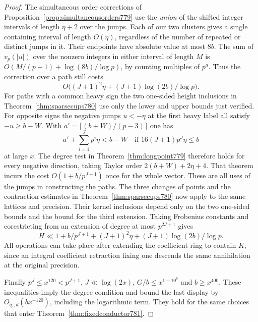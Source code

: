 \documentclass[a4paper,11pt]{article}
\theoremstyle{definition}
\theoremstyle{remark}
\numberwithin{equation}{section}
\begin{document}
\begin{proof}
The simultaneous order corrections of
Proposition~\ref{prop:simultaneousorders779} use the
\emph{union} of the shifted integer intervals of
length \(\eta+2\) over the jumps. Each of our two
clusters gives a single containing interval of length
\(O(\eta)\), regardless of the number of repeated or
distinct jumps in it. Their endpoints have absolute
value at most \(8b\). The sum of \(v_p(|u|)\) over
the nonzero integers in either interval of length
\(M\) is \(O(M/(p-1)+\log(8b)/\log p)\), by counting
multiples of \(p^a\). Thus the correction over a
path still costs
\[
        O\big((J+1)^2\eta+(J+1)\log(2b)/\log p\big).
\]
For paths with a common heavy sign the two one-sided
height inclusions in Theorem~\ref{thm:sparsecups780}
use only the lower and upper bounds just verified.
For opposite signs the negative jumps \(u<-\eta\)
at the first heavy label all satisfy \(-u\ge b-W\).
With \(a'=\lceil(b+W)/(p-3)\rceil\) one has
\[
       a'+\sum_{i=1}^Jp^i\eta<b-W
              \quad\text{if }16(J+1)p^J\eta\le b
\]
at large \(x\). The degree test in
Theorem~\ref{thm:longpoint779} therefore holds for
every negative direction, taking Taylor order
\(2(b+W)+2\eta+4\). That theorem incurs the cost
\(O(1+b/p^{J+1})\) once for the whole vector.
These are all uses of the jumps in constructing
the paths. The three changes of points and the
contraction estimates in Theorem~\ref{thm:sparsecups780}
now apply to the same lattices and precision. Their
kernel inclusions depend only on the two one-sided
bounds and the bound for the third extension. Taking
Frobenius constants and corestricting from an extension
of degree at most \(p^{2J+1}\) gives
\[
     H\ll 1+b/p^{J+1}+(J+1)^2\eta
                                  +(J+1)\log(2b)/\log p .
\]
All operations can take place after extending the
coefficient ring to contain \(K\), since an integral
coefficient retraction fixing one descends the same
annihilation at the original precision.

Finally \(p^J\le x^{120}<p^{J+1}\), \(J\ll\log(2x)\),
\(G/b\le x^{1-10^6}\) and \(b\ge x^{400}\).
These inequalities imply the degree condition and bound
the last display by \(O_{q_0,d}(b x^{-120})\), including
the logarithmic term. They hold for the same choices
that enter Theorem~\ref{thm:fixedconductor781}.
\end{proof}
\end{document}
